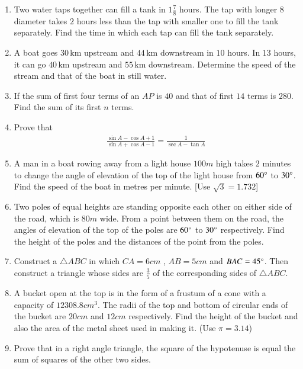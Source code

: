 \documentclass[12pt,-letter paper]{article}
\begin{document}
\begin{enumerate}
\item Two water taps together can fill a tank in $1\frac{7}{8}$ hours. The tap with longer $8$ diameter takes $2$ hours less than the tap with smaller one to fill the tank separately. Find the time in which each tap can fill the tank separately.
\item A boat goes $30 \,\text{km}$ upstream and $44 \,\text{km}$ downstream in $10$ hours. In $13$ hours, it can go $40\,\text{km}$ upstream and $55 \,\text{km}$ downstream. Determine the speed of the stream and that of the boat in still water.
\item If the sum of first four terms of an $AP$ is $40$ and that of first $14$ terms is $280$. Find the sum of its first $n$ terms.
\item Prove that \begin{align*} \frac{\sin A-\cos A+1}{\sin A+ \cos A-1}  =\frac{1}{\sec A-\tan A}\end{align*}
\item A man in a boat rowing away from a light house $100m$  high takes $2$ minutes to change the angle of elevation of the top of the light house from $60\degree$ to $30\degree$. Find the speed of the boat in metres per minute. [Use $\sqrt{3}=1.732$]
\item Two poles of equal heights are standing opposite each other on either side of the road, which is $80 m$  wide. From a point between them on the road, the angles of elevation of the top of the poles are $60\degree$ to $30\degree$ respectively. Find the height of the poles and the distances of the point from the poles.
\item Construct a $\triangle ABC$ in which $CA = 6cm$ , $AB = 5cm$ and $BAC= 45\degree$. Then  construct a triangle whose sides are $\frac{3}{5}$ of the corresponding sides of $\triangle ABC$.
\item A bucket open at the top is in the form of a frustum of a cone with a capacity of $12308.8 cm^3$. The radii of the top and bottom of circular ends of the bucket are $20 cm$ and $12cm$ respectively. Find the height of the bucket and also the area of the metal sheet used in making it. (Use  $\pi= 3.14$)
\item Prove that in a right angle triangle, the square of the hypotenuse is equal the sum of squares of the other two sides.

\end{enumerate}
\end{document}
